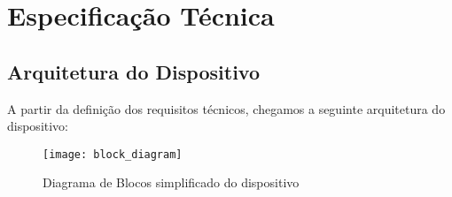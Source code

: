 \documentclass[../monografia.tex]{subfiles}
\begin{document}
\section{Especificação Técnica}

\subsection{Arquitetura do Dispositivo} %
A partir da definição dos requisitos técnicos, chegamos a seguinte arquitetura do dispositivo:

\begin{figure}[h]
    \centering
    \texttt{[image: block\_diagram]}
    \caption{Diagrama de Blocos simplificado do dispositivo}
    \label{fig:Diagrama de Blocos}
\end{figure}
\end{document}
